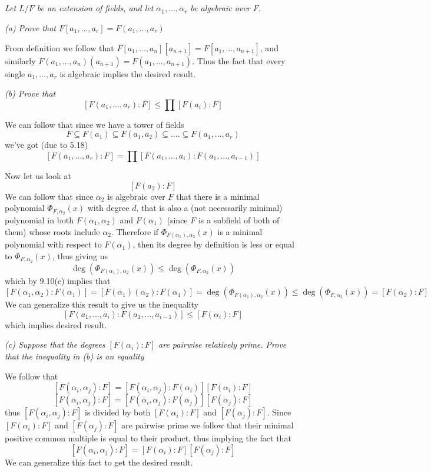 \documentclass[11pt,oneside,titlepage]{book}
\begin{document}
\subsection{}

\textit{Let $L/F$ be an extension of fields, and let $\alpha_1, ..., \alpha_r$ be
  algebraic over $F$.}

\textit{(a) Prove that $F[a_1, ..., a_r] = F(a_1, ..., a_r)$}

From definition we follow that $F[a_1, ..., a_n][a_{n + 1}] = F[a_1, ..., a_{n + 1}]$,
and similarly $F(a_1, ..., a_n)(a_{n + 1}) = F(a_1, ..., a_{n + 1})$. Thus the
fact that every single $a_1, ..., a_r$ is algebraic implies the desired result.

\textit{(b) Prove that
  $$[F(a_1, ..., a_r) : F] \leq \prod{[F(a_i): F]}$$
}

We can follow that since we have a tower of fields
$$F \subseteq F(a_1) \subseteq F(a_1, a_2)
\subseteq .... \subseteq F(a_1, ..., a_r)$$
we've got (due to 5.18)
$$[F(a_1, ..., a_r) : F] =
\prod{[F(a_1, ..., a_i):F(a_1, ..., a_{i - 1})]}$$

Now let us look at
$$[F(a_2):F]$$
We can follow that since $\alpha_2$ is algebraic over $F$ that there
is a minimal polynomial $\Phi_{F, \alpha_2}(x)$ with degree $d$, that
is also a (not necessarily minimal) polynomial in both $F(\alpha_1,
\alpha_2)$ and $F(\alpha_1)$ (since $F$ is a subfield of both of them)
whose roots include $\alpha_2$. Therefore if $\Phi_{F(\alpha_1),
\alpha_2}(x)$ is a minimal polynomial with respect to $F(\alpha_1)$,
then its degree by definition is less or equal to $\Phi_{F,
\alpha_2}(x)$, thus giving us
$$\deg(\Phi_{F(\alpha_1), \alpha_2}(x)) \leq \deg(\Phi_{F, \alpha_2}(x))$$
which by 9.10(c) implies that
$$[F(\alpha_1, \alpha_2): F(\alpha_1)] = [F(\alpha_1)(\alpha_2): F(\alpha_1)] =
\deg(\Phi_{F(\alpha_1), \alpha_2}(x)) \leq \deg(\Phi_{F, \alpha_2}(x)) = [F(\alpha_2): F]$$
We can generalize this result to give us the inequality
$$[F(a_1, ..., a_i):F(a_1, ..., a_{i - 1})] \leq [F(\alpha_i) : F]$$
which implies desired result.

\textit{(c) Suppose that the degrees $[F(\alpha_i):F]$ are pairwise relatively prime.
  Prove that the inequality in (b) is an equality}

We follow that
$$[F(\alpha_i, \alpha_j): F] = [F(\alpha_i, \alpha_j): F(\alpha_i)] [F(\alpha_i): F]$$
$$[F(\alpha_i, \alpha_j): F] = [F(\alpha_i, \alpha_j): F(\alpha_j)] [F(\alpha_j): F]$$
thus $[F(\alpha_i, \alpha_j): F]$ is divided by both $[F(\alpha_i): F]$ and
$[F(\alpha_j): F]$. Since $[F(\alpha_i): F]$ and $[F(\alpha_j): F]$
are pairwise prime we follow that their minimal positive common
multiple is equal to their product, thus implying the fact that
$$[F(\alpha_i, \alpha_j): F] = [F(\alpha_i): F] [F(\alpha_j): F]$$
We can generalize this fact to get the desired result.
\end{document}

